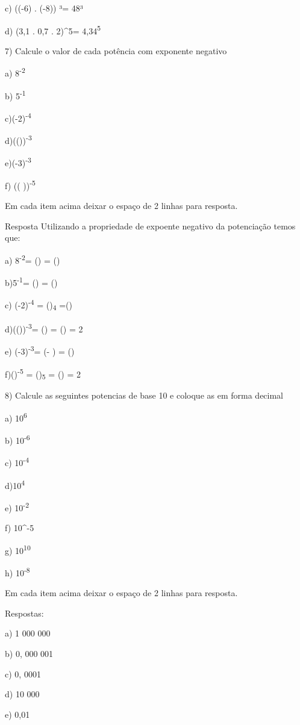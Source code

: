 c) ((-6) . (-8)) ³= 48³

d) (3,1 . 0,7 . 2)^{5}= 4,34\textsuperscript{5}

7) Calcule o valor de cada potência com exponente negativo

a) 8\textsuperscript{-2}

b) 5\textsuperscript{-1}

c)(-2)\textsuperscript{-4}

d)(())\textsuperscript{-3}

e)(-3)\textsuperscript{-3}

f) (\left(  \right))\textsuperscript{-5}

Em cada item acima deixar o espaço de 2 linhas para resposta.

Resposta Utilizando a propriedade de expoente negativo da potenciação
temos que:

a) 8\textsuperscript{-2}= () = ()

b)5\textsuperscript{-1}= () = ()

c) (-2)\textsuperscript{-4} = ()\textsubscript{4}
=()

d)(())\textsuperscript{-3}= () =
() = 2

e) (-3)\textsuperscript{-3}= (- ) = ()

f)()\textsuperscript{-5} =
()\textsubscript{5} = () = 2

8) Calcule as seguintes potencias de base 10 e coloque as em forma
decimal

a) 10\textsuperscript{6}

b) 10\textsuperscript{-6}

c) 10\textsuperscript{-4}

d)10\textsuperscript{4}

e) 10\textsuperscript{-2}

f) 10^{-5}

g) 10\textsuperscript{10}

h) 10\textsuperscript{-8}

Em cada item acima deixar o espaço de 2 linhas para resposta.

Respostas:

a) 1 000 000

b) 0, 000 001

c) 0, 0001

d) 10 000

e) 0,01

